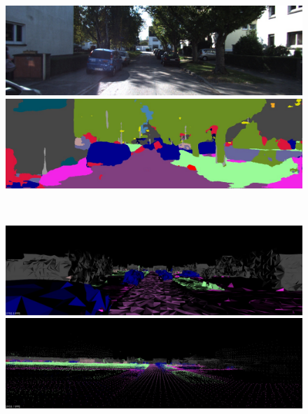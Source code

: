 \begin{figure}[htbp]
 \begin{minipage}[b]{0.50\hsize}
 \begin{center}
  \includegraphics[keepaspectratio, scale=0.18]{./picture/bgrimage/bgrimage5.jpg}
  \end{center}
 \end{minipage}
 \begin{minipage}[b]{0.5\hsize}
 \begin{center}
  \includegraphics[keepaspectratio, scale=0.18]{./picture/segimage/image5.jpg}
  \end{center}
 \end{minipage} \\
 \begin{minipage}[b]{0.50\hsize}
 \begin{center}
  \includegraphics[keepaspectratio, scale=0.18]{./picture/mesh_map_image/image5.jpg}
  \end{center}
 \end{minipage}
 \begin{minipage}[b]{0.50\hsize}
 \begin{center}
  \includegraphics[keepaspectratio, scale=0.18]{./picture/point_map_image/image5.jpg}

\end{center}
\end{minipage}
\end{figure}

